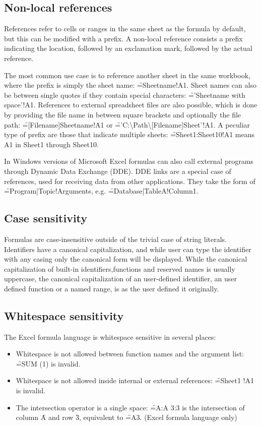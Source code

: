 \subsection{Non-local references}
\label{subsection:ExternalRefsDDE}

References refer to cells or ranges in the same sheet as the formula by default, but this can be modified with a prefix. A non-local reference consists a prefix indicating the location, followed by an exclamation mark, followed by the actual reference.

The most common use case is to reference another sheet in the same workbook, where the prefix is simply the sheet name: \f{=Sheetname!A1}.
Sheet names can also be between single quotes if they contain special characters: \f{='Sheetname with space'!A1}. 
References to external spreadsheet files are also possible, which is done by providing the file name in between square brackets and optionally the file path: \f{=[Filename]Sheetname!A1} or \f{='C:{\textbackslash}Path{\textbackslash}[Filename]Sheet'!A1}.
A peculiar type of prefix are those that indicate multiple sheets: \f{=Sheet1:Sheet10!A1} means A1 in Sheet1 through Sheet10.

In Windows versions of Microsoft Excel formulas can also call external programs through Dynamic Data Exchange (DDE).
DDE links are a special case of references, used for receiving data from other applications.
They take the form of \f{=Program|Topic!Arguments}, e.g. \f{=Database|TableA!Column1}.

\subsection{Case sensitivity}

Formulas are case-insensitive outside of the trivial case of string literals.
Identifiers have a canonical capitalization, and while user can type the identifier with any casing only the canonical form will be displayed.
While the canonical capitalization of built-in identifiers,functions and reserved names is usually uppercase, the canonical capitalization of an user-defined identifier, an user defined function or a named range, is as the user defined it originally.

\subsection{Whitespace sensitivity}

The Excel formula language is whitespace sensitive in several places:
\begin{itemize}
\item Whitespace is not allowed between function names and the argument list: \f{=SUM  (1)} is invalid.
\item Whitespace is not allowed inside internal or external references: \f{=Sheet1 !A1} is invalid.
\item The intersection operator is a single space: \f{=A:A 3:3} is the intersection of column \f{A} and row \f{3}, equivalent to \f{=A3}. (Excel formula language only)
\end{itemize}

